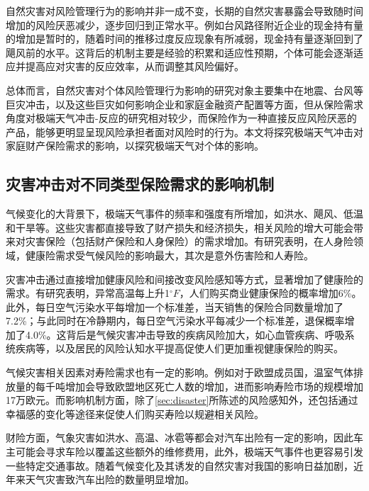 自然灾害对风险管理行为的影响并非一成不变，长期的自然灾害暴露会导致随时间增加的风险厌恶减少，逐步回归到正常水平\citep{cheong2022natural,ingwersen2023evolution}。例如台风路径附近企业的现金持有量的增加是暂时的，随着时间的推移过度反应现象有所减弱，现金持有量逐渐回到了飓风前的水平\citep{shao2024typhoons,0Do}。这背后的机制主要是经验的积累和适应性预期，个体可能会逐渐适应并提高应对灾害的反应效率，从而调整其风险偏好\citep{0Do}。

总体而言，自然灾害对个体风险管理行为影响的研究对象主要集中在地震、台风等巨灾冲击，以及这些巨灾如何影响企业和家庭金融资产配置等方面，但从保险需求角度对极端天气冲击-反应的研究相对较少，而保险作为一种直接反应风险厌恶的产品，能够更明显呈现风险承担者面对风险时的行为。本文将探究极端天气冲击对家庭财产保险需求的影响，以探究极端天气对个体的影响。

\subsection{灾害冲击对不同类型保险需求的影响机制}

气候变化的大背景下，极端天气事件的频率和强度有所增加，如洪水、飓风、低温和干旱等\citep{blazey2007financial}。这些灾害都直接导致了财产损失和经济损失，相关风险的增大可能会带来对灾害保险（包括财产保险和人身保险）的需求增加。有研究表明，在人身险领域，健康险需求受气候风险的影响最大，其次是意外伤害险和人寿险\citep{JRPL202302005}。

灾害冲击通过直接增加健康风险和间接改变风险感知等方式，显著增加了健康险的需求。有研究表明，异常高温每上升1$^\circ F$，人们购买商业健康保险的概率增加6\%\citep{zhong2022exposure}。此外，每日空气污染水平每增加一个标准差，当天销售的保险合同数量增加了7.2\%；与此同时在冷静期内，每日空气污染水平每减少一个标准差，退保概率增加了4.0\%\citep{2018Something}。这背后是气候灾害冲击导致的疾病风险加大，如心血管疾病、呼吸系统疾病等\citep{aitken2022climate,brown2008climate}，以及居民的风险认知水平提高\citep{1021776338.nh}促使人们更加重视健康保险的购买。

气候灾害相关因素对寿险需求也有一定的影响。例如对于欧盟成员国，温室气体排放量的每千吨增加会导致欧盟地区死亡人数的增加，进而影响寿险市场的规模增加17万欧元\citep{melnychenko2021influence}。而影响机制方面，除了\ref{sec:disaster}所陈述的风险感知外，还包括通过幸福感的变化等途径来促使人们购买寿险以规避相关风险\citep{avdeenko2021impact}。

财险方面，气象灾害如洪水、高温、冰雹等都会对汽车出险有一定的影响，因此车主可能会寻求车险以覆盖这些额外的维修费用\citep{changnon1997effects,xu2014climate}，此外，极端天气事件也更容易引发一些特定交通事故\citep{吴建平2008交通事故与天气气候关系分析}。随着气候变化及其诱发的自然灾害对我国的影响日益加剧，近年来天气灾害致汽车出险的数量明显增加\citep{张翠华2020天气灾害致车险理赔的风险分析}。

